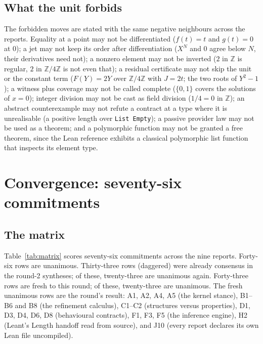 \documentclass[11pt,a4paper]{article}
\newcommand{\code}[1]{\nolinkurl{#1}}
\newcommand{\Z}{\mathbb Z}
\theoremstyle{definition}
\begin{document}
\subsection{What the unit forbids}
The forbidden moves are stated with the same negative neighbours across the reports. Equality at a point may not be differentiated ($f(t)=t$ and $g(t)=0$ at $0$); a jet may not keep its order after differentiation ($X^N$ and $0$ agree below $N$, their derivatives need not); a nonzero element may not be inverted ($2$ in $\Z$ is regular, $2$ in $\Z/4\Z$ is not even that); a residual certificate may not skip the unit or the constant term ($F(Y)=2Y$ over $\Z/4\Z$ with $J=2t$; the two roots of $Y^2-1$); a witness plus coverage may not be called complete ($\{0,1\}$ covers the solutions of $x=0$); integer division may not be cast as field division ($1/4=0$ in $\Z$); an abstract counterexample may not refute a contract at a type where it is unrealisable (a positive length over \code{List Empty}); a passive provider law may not be used as a theorem; and a polymorphic function may not be granted a free theorem, since the Lean reference exhibits a classical polymorphic list function that inspects its element type.

\section{Convergence: seventy-six commitments}\label{sec:convergence}

\subsection{The matrix}
Table~\ref{tab:matrix} scores seventy-six commitments across the nine reports. Forty-six rows are unanimous. Thirty-three rows (daggered) were already consensus in the round-2 syntheses; of these, twenty-three are unanimous again. Forty-three rows are fresh to this round; of these, twenty-three are unanimous. The fresh unanimous rows are the round's result: A1, A2, A4, A5 (the kernel stance), B1--B6 and B8 (the refinement calculus), C1--C2 (structures versus properties), D1, D3, D4, D6, D8 (behavioural contracts), F1, F3, F5 (the inference engine), H2 (Leant's Length handoff read from source), and J10 (every report declares its own Lean file uncompiled).
\end{document}
